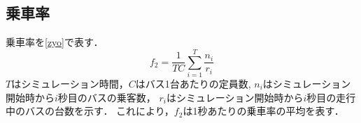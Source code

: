 \documentclass[main]{subfiles}
\begin{document}
        \subsection{乗車率}
        乗車率を\ref{zyo}で表す．
        \begin{equation}
            f_2 = \frac{1}{TC} \sum_{i=1}^{T} \frac{n_i}{r_i}
            \label{zyo}
        \end{equation}
        $T$はシミュレーション時間，$C$はバス1台あたりの定員数, $n_i$はシミュレーション開始時から$i$秒目のバスの乗客数，
        $r_i$はシミュレーション開始時から$i$秒目の走行中のバスの台数を示す．
        これにより，$f_2$は1秒あたりの乗車率の平均を表す．
\end{document}

